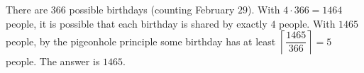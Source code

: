 There are $366$ possible birthdays (counting February $29$). With $4\cdot366=1464$ people, it is possible that each birthday is shared by exactly $4$ people. With $1465$ people, by the pigeonhole principle some birthday has at least $\left\lceil\dfrac{1465}{366}\right\rceil=5$ people. The answer is $\boxed{1465}$.
